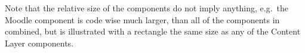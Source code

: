 Note that the relative size of the components do not imply anything, e.g.\ the Moodle component is code wise much larger, than all of the components in \system{} combined, but is illustrated with a rectangle the same size as any of the Content Layer components.













